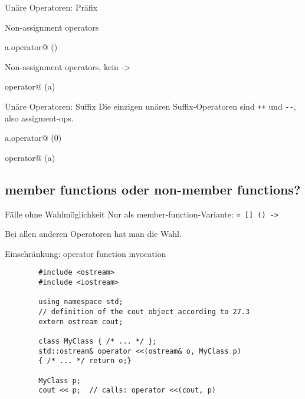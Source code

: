 \begin{frame}{Unäre Operatoren: Präfix}
	\onslide*<+>
	{
		Non-assignment operators
		
		\begin{block}{a.operator@ ()}
			
		\end{block}
	}
	
	\onslide*<+>
	{
		Non-assignment operators, kein -\textgreater
		
		\begin{block}{operator@ (a)}
			
		\end{block}
	}
\end{frame}

\begin{frame}[fragile]{Unäre Operatoren: Suffix}
	Die einzigen unären Suffix-Operatoren sind \verb!++! und \verb!--!, also assigment-ops.
	
	\onslide*<+>
	{
		\begin{block}{a.operator@ (0)}
			
		\end{block}
	}
	
	\onslide*<+>
	{
		\begin{block}{operator@ (a)}
			
		\end{block}
	}
\end{frame}




\subsection{member functions oder non-member functions?}

\begin{frame}[fragile]{Fälle ohne Wahlmöglichkeit}
	Nur als member-function-Variante: \verb!= [] () ->!
	
	\vspace{1em}
	\pause
	
	Bei allen anderen Operatoren hat man die Wahl.
	
	Einschränkung: operator function invocation
	\begin{lstlisting}
		#include <ostream>
		#include <iostream>
		
		using namespace std;
		// definition of the cout object according to 27.3
		extern ostream cout;
		
		class MyClass { /* ... */ };
		std::ostream& operator <<(ostream& o, MyClass p)
		{ /* ... */ return o;}
		
		MyClass p;
		cout << p;	// calls: operator <<(cout, p)
	\end{lstlisting}
\end{frame}

